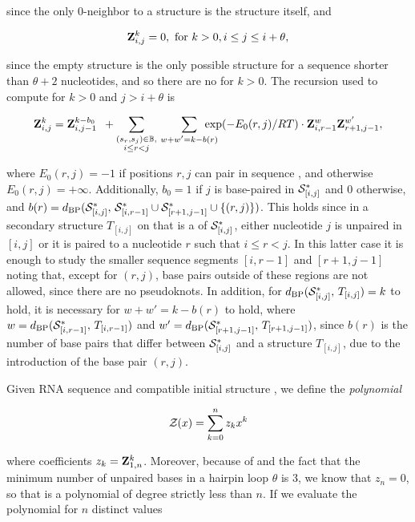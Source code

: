 since the only 0-neighbor to a structure \strSt
is the structure \strSt itself, and

\begin{align}
\label{eq:fftbor:initZpart2}
\bfZ{k}{i,j} = 0, \text{ for } k > 0, i \le j \leq i + \theta,
\end{align}

since the empty structure is the only possible structure for a
sequence shorter than $\theta + 2$ nucleotides, and so there are no
\kNbrs for $k>0$. The recursion used to compute
 for $k > 0$ and $j > i+\theta$ is

\begin{align}
\label{eq:fftbor:bfZkij}
\bfZ{k}{i,j} = \bfZ{k-b_0}{i,j-1}\enspace +
\sum_{\substack{(s_r,s_j) \in \bpSet, \\ i \leq r<j}}\qquad
\sum_{\mathclap{w+w'=k-b(r)}}\enspace
\exp(-E_0(r,j)/RT) \cdot \bfZ{w}{i,r-1} \bfZ{w'}{r+1,j-1},
\end{align}

where $E_0(r,j) = -1$ if positions $r,j$ can pair in sequence \seq,
and otherwise $E_0(r,j) = +\infty$. Additionally,
$b_0 = 1$ if $j$ is base-paired
in $\mathcal S^*_{[i,j]}$ and 0 otherwise, and
$b(r)=d_{\text{BP}}(\mathcal S^*_{[i,j]},\,\mathcal S^*_{[i,r-1]} \cup \mathcal S^*_{[r+1,j-1]} \cup\{(r,j)\})$.
This holds since in a secondary
structure $T_{[i,j]}$ on \seqIJ that is a \kNbr of
$\mathcal S^*_{[i,j]}$,
either nucleotide $j$ is unpaired in $[i,j]$ or it is
paired to a nucleotide $r$ such that $i \leq r < j$. In this
latter case it is enough to study the smaller sequence segments
$[i,r-1]$ and $[r+1,j-1]$ noting that, except for $(r,j)$,
base pairs outside of these regions are not allowed, since there
are no pseudoknots. In addition,
for $d_{\text{BP}}(\mathcal S^*_{[i,j]},\,T_{[i,j]}) = k$ to hold,
it is necessary for $w+w' = k -b(r)$ to hold, where $w =
d_{\text{BP}}(\mathcal S^*_{[i,r-1]},\,T_{[i,r-1]})$ and $w' =
d_{\text{BP}}(\mathcal S^*_{[r+1,j-1]},\,T_{[r+1,j-1]})$, since $b(r)$ is the
number of base pairs that differ between $\mathcal S^*_{[i,j]}$ and a
structure $T_{[i,j]}$, due to the introduction of the base pair
$(r,j)$.

Given RNA sequence \seq and compatible initial structure \strSt,
we define the {\em polynomial}

\begin{align}
\label{eq:fftbor:zOfX}
\fullZx = \sum_{k=0}^n z_k x^k
\end{align}

where coefficients $z_k={\bf Z}^{k}_{1,n}$. Moreover, because of
 and the fact that the minimum number of
unpaired bases in a hairpin loop $\theta$ is 3, we know that $z_n=0$,
so that \fullZx is a polynomial of degree strictly less than $n$.
If we evaluate the polynomial \fullZx for $n$ distinct values

